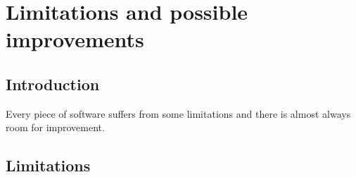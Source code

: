 \documentclass[a4paper,12pt,draft]{article}
\begin{document}
\section{Limitations and possible improvements}

\label{limitations-improvements}

\subsection{Introduction}

Every piece of software suffers from some limitations and there is almost
always room for improvement.

\subsection{Limitations}
\end{document}
